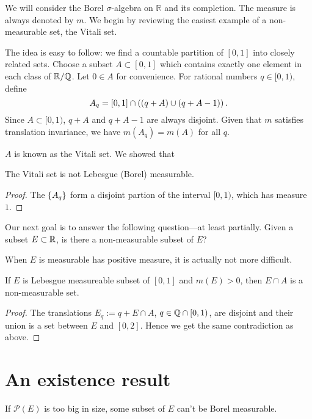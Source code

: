 \documentclass{article}
\begin{document}
\self

We will consider the Borel $\sigma$-algebra on $\mathbb{R}$ and its completion. The measure is always denoted by $m$. We begin by reviewing the easiest example of a non-measurable set, the Vitali set.

The idea is easy to follow: we find a countable partition of $[0,1]$ into closely related sets. Choose a subset $A\subset[0,1]$ which contains exactly one element in each class of $\mathbb{R}/\mathbb{Q}$. Let $0\in A$ for convenience. For rational numbers $q\in [0,1)$, define
\[
    A_q = [0,1]\cap\left((q+A)\cup(q+A-1)\right).
\]
Since $A\subset[0,1)$, $q+A$ and $q+A-1$ are always disjoint. Given that $m$ satisfies translation invariance, we have $m(A_q)=m(A)$ for all $q$.

$A$ is known as the Vitali set. We showed that

\begin{proposition}
    The Vitali set is not Lebesgue (Borel) measurable.
\end{proposition}

\begin{proof}
    The $\left\{A_q\right\}$ form a disjoint partion of the interval $[0,1)$, which has measure $1$.
\end{proof}

Our next goal is to answer the following question---at least partially. Given a subset $E\subset\mathbb{R}$, is there a non-measurable subset of $E$? 

When $E$ is measurable has positive measure, it is actually not more difficult.

\begin{proposition}
    If $E$ is Lebesgue measureable subset of $[0,1]$ and $m(E)>0$, then $E\cap A$ is a non-measurable set.
\end{proposition}

\begin{proof}
    The translations $E_q:=q+E\cap A$, $q\in\mathbb{Q}\cap[0,1)$, are disjoint and their union is a set between $E$ and $[0,2]$. Hence we get the same contradiction as above.
\end{proof}

\section{An existence result}

If $\mathcal{P}(E)$ is too big in size, some subset of $E$ can't be Borel measurable.
\end{document}
